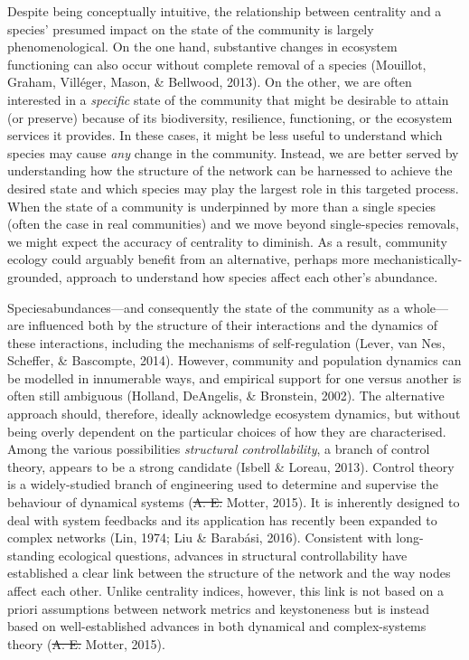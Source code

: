 \documentclass[a4paper]{artikel1}
\theoremstyle{definition}
\theoremstyle{definition}
\theoremstyle{definition}
\theoremstyle{remark}
\providecommand{\DIFaddtex}[1]{{\protect\color{blue}\uwave{#1}}} %
\providecommand{\DIFdeltex}[1]{{\protect\color{red}\sout{#1}}}                      %
\providecommand{\DIFaddbegin}{} %
\providecommand{\DIFaddend}{} %
\providecommand{\DIFdelbegin}{} %
\providecommand{\DIFdelend}{} %
\providecommand{\DIFadd}[1]{\texorpdfstring{\DIFaddtex{#1}}{#1}} %
\providecommand{\DIFdel}[1]{\texorpdfstring{\DIFdeltex{#1}}{}} %
\begin{document}
Despite being conceptually intuitive, the relationship between
centrality and a species' presumed impact on the state of the community
is largely phenomenological. On the one hand, substantive changes in
ecosystem functioning can also occur without complete removal of a
species (Mouillot, Graham, Villéger, Mason, \& Bellwood, 2013). On the
other, we are often interested in a \emph{specific} state of the
community that might be desirable to attain (or preserve) because of its
biodiversity, resilience, functioning, or the ecosystem services it
provides. In these cases, it might be less useful to understand which
species may cause \emph{any} change in the community. Instead, we are
better served by understanding how the structure of the network can be
harnessed to achieve the desired state and which species may play the
largest role in this targeted process. When the state of a community is
underpinned by more than a single species (often the case in real
communities) and we move beyond single-species removals, we might expect
the accuracy of centrality to diminish. As a result, community ecology
could arguably benefit from an alternative, perhaps more
mechanistically-grounded, approach to understand how species affect each
other's abundance.

Species\DIFaddbegin \DIFadd{' }\DIFaddend abundances---and consequently the state of the community as a
whole---are influenced both by the structure of their interactions and
the dynamics of these interactions, including the mechanisms of
self-regulation (Lever, van Nes, Scheffer, \& Bascompte, 2014). However,
community and population dynamics can be modelled in innumerable ways,
and empirical support for one versus another is often still ambiguous
(Holland, DeAngelis, \& Bronstein, 2002). The alternative approach
should, therefore, ideally acknowledge ecosystem dynamics, but without
being overly dependent on the particular choices of how they are
characterised. Among the various possibilities \emph{structural
controllability}, a branch of control theory, appears to be a strong
candidate (Isbell \& Loreau, 2013). Control theory is a widely-studied
branch of engineering used to determine and supervise the behaviour of
dynamical systems (\DIFdelbegin \DIFdel{A. E. }\DIFdelend Motter, 2015). It is inherently designed to deal with
system feedbacks and its application has recently been expanded to
complex networks (Lin, 1974; Liu \& Barabási, 2016). Consistent with
long-standing ecological questions, advances in structural
controllability have established a clear link between the structure of
the network and the way nodes affect each other. Unlike centrality
indices, however, this link is not based on a priori assumptions between
network metrics and keystoneness but is instead based on
well-established advances in both dynamical and complex-systems theory
(\DIFdelbegin \DIFdel{A. E. }\DIFdelend Motter, 2015).
\end{document}
